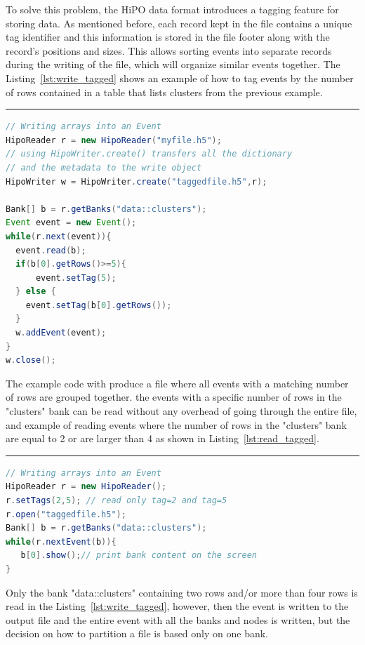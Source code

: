 To solve this problem, the HiPO data format introduces a tagging feature for storing data. As mentioned before, each record kept in the file contains a unique
tag identifier and this information is stored in the file footer along with the record's positions and sizes. This allows sorting events into separate records during
the writing of the file, which will organize similar events together. The Listing~\ref{lst:write_tagged} shows an example of how to tag events by the number of 
rows contained in a table that lists clusters from the previous example. 

\rule{16.5cm}{0.4pt}
\begin{lstlisting}[language=java, caption=Java example to create and write primitive types into an event, label=lst:write_tagged]
// Writing arrays into an Event
HipoReader r = new HipoReader("myfile.h5");
// using HipoWriter.create() transfers all the dictionary
// and the metadata to the write object
HipoWriter w = HipoWriter.create("taggedfile.h5",r);

Bank[] b = r.getBanks("data::clusters");
Event event = new Event();
while(r.next(event)){
  event.read(b);
  if(b[0].getRows()>=5){
      event.setTag(5);
  } else {
  	event.setTag(b[0].getRows());
  }
  w.addEvent(event);
}
w.close();
\end{lstlisting}

The example code with produce a file where all events with a matching number of rows are grouped together. the events with a specific number of
rows in the "clusters" bank can be read without any overhead of going through the entire file, and example of reading events where the number of
rows in the "clusters" bank are equal to 2 or are larger than 4 as shown in Listing~\ref{lst:read_tagged}.

\rule{16.5cm}{0.4pt}
\begin{lstlisting}[language=java, caption=Java example to sort events in the output file depending on number of rows in the table, label=lst:write_tagged]
// Writing arrays into an Event
HipoReader r = new HipoReader();
r.setTags(2,5); // read only tag=2 and tag=5
r.open("taggedfile.h5");
Bank[] b = r.getBanks("data::clusters");
while(r.nextEvent(b)){
   b[0].show();// print bank content on the screen
}
\end{lstlisting}

Only the bank "data::clusters" containing two rows and/or more than four rows is read in the Listing~\ref{lst:write_tagged}, however, then the event is written to the output file and the entire event with all the banks and nodes is written, but the decision on how to partition a file is based only on one bank. 




